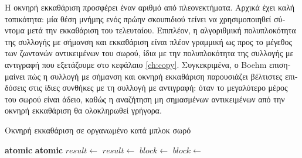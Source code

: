 \begin{greek}
Η οκνηρή εκκαθάριση προσφέρει έναν αριθμό από πλεονεκτήματα.
Αρχικά έχει καλή τοπικότητα: μία θέση μνήμης ενός πρώην σκουπιδιού 
τείνει να χρησιμοποιηθεί σύντομα μετά την εκκαθάριση του τελευταίου.
Επιπλέον, η αλγοριθμική πολυπλοκότητα της συλλογής με σήμανση και
εκκαθάριση είναι πλέον γραμμική ως προς το μέγεθος των ζωντανών
αντικειμένων του σωρού, ίδια με την πολυπλοκότητα της συλλογής με
αντιγραφή που εξετάζουμε στο κεφάλαιο \ref{ch:copy}. Συγκεκριμένα,
ο Boehm \cite{boehm1995dynamic} επισημαίνει πώς η συλλογή με σήμανση και οκνηρή
εκκαθάριση παρουσιάζει βέλτιστες επιδόσεις στις ίδιες συνθήκες με
τη συλλογή με αντιγραφή: όταν το μεγαλύτερο μέρος του σωρού είναι
άδειο, καθώς η αναζήτηση μη σημασμένων αντικειμένων από την οκνηρή
εκκαθάριση θα ολοκληρωθεί γρήγορα.

\begin{algorithm}
  \caption{Οκνηρή εκκαθάριση σε οργανωμένο κατά μπλοκ σωρό}
  \label{alg:mrkswp5}
  \begin{algorithmic}[1]
      \State \textbf{atomic}
      \State {}
         
          \State {} 
        \Else
          \State {}
        \EndIf
      \EndFor
    \EndProcedure
    \Statex
      \State \textbf{atomic}
      \State $result \gets$  
       
        \State {} 
        \State $result \gets$ 
      \EndIf
      \State {} 
    \EndFunction
    \Statex
      \Repeat
        \State $block \gets$ 
          \State {}
            \State \Return{\null}
          \EndIf
        \EndIf
       
      \State {}
    \EndProcedure
    \Statex
     
      \State $block \gets$ 
       
        \State {}
      \EndIf
    \EndProcedure
  \end{algorithmic}
\end{algorithm}



\end{greek}
